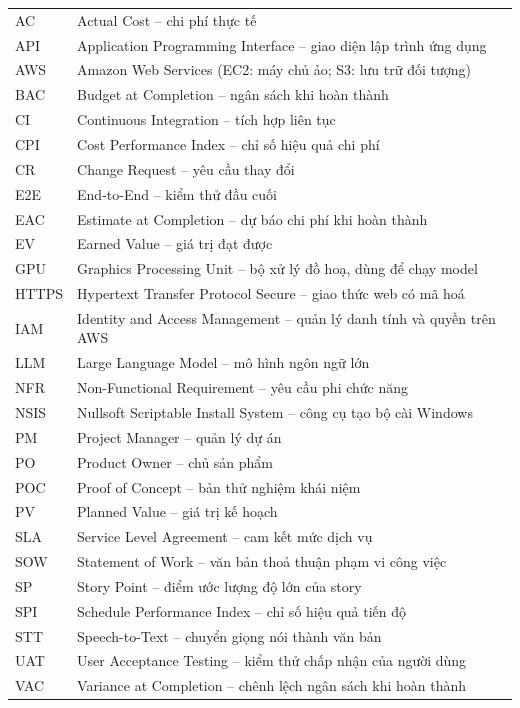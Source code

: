 \documentclass[12pt,a4paper]{report}
\begin{document}
\begin{center}
  \begin{tabular}{@{}P{2.2cm}P{13.2cm}@{}}
    \toprule
     &  \\
    \midrule
    AC     & Actual Cost -- chi phí thực tế \\
    API    & Application Programming Interface -- giao diện lập trình ứng dụng \\
    AWS    & Amazon Web Services (EC2: máy chủ ảo; S3: lưu trữ đối tượng) \\
    BAC    & Budget at Completion -- ngân sách khi hoàn thành \\
    CI     & Continuous Integration -- tích hợp liên tục \\
    CPI    & Cost Performance Index -- chỉ số hiệu quả chi phí \\
    CR     & Change Request -- yêu cầu thay đổi \\
    E2E    & End-to-End -- kiểm thử đầu cuối \\
    EAC    & Estimate at Completion -- dự báo chi phí khi hoàn thành \\
    EV     & Earned Value -- giá trị đạt được \\
    GPU    & Graphics Processing Unit -- bộ xử lý đồ hoạ, dùng để chạy model \\
    HTTPS  & Hypertext Transfer Protocol Secure -- giao thức web có mã hoá \\
    IAM    & Identity and Access Management -- quản lý danh tính và quyền trên AWS \\
    LLM    & Large Language Model -- mô hình ngôn ngữ lớn \\
    NFR    & Non-Functional Requirement -- yêu cầu phi chức năng \\
    NSIS   & Nullsoft Scriptable Install System -- công cụ tạo bộ cài Windows \\
    PM     & Project Manager -- quản lý dự án \\
    PO     & Product Owner -- chủ sản phẩm \\
    POC    & Proof of Concept -- bản thử nghiệm khái niệm \\
    PV     & Planned Value -- giá trị kế hoạch \\
    SLA    & Service Level Agreement -- cam kết mức dịch vụ \\
    SOW    & Statement of Work -- văn bản thoả thuận phạm vi công việc \\
    SP     & Story Point -- điểm ước lượng độ lớn của story \\
    SPI    & Schedule Performance Index -- chỉ số hiệu quả tiến độ \\
    STT    & Speech-to-Text -- chuyển giọng nói thành văn bản \\
    UAT    & User Acceptance Testing -- kiểm thử chấp nhận của người dùng \\
    VAC    & Variance at Completion -- chênh lệch ngân sách khi hoàn thành \\
    \bottomrule
  \end{tabular}
\end{center}
\end{document}
